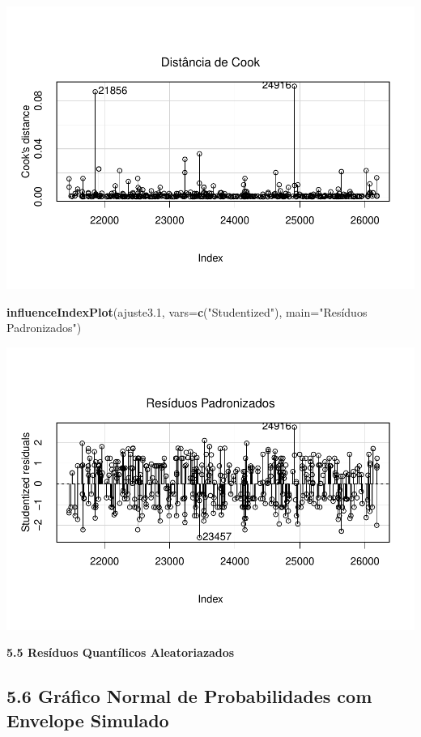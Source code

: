 \documentclass[]{article}
\newenvironment{Shaded}{\begin{snugshade}}{\end{snugshade}}
\newcommand{\KeywordTok}[1]{\textcolor[rgb]{0.13,0.29,0.53}{\textbf{{#1}}}}
\newcommand{\DataTypeTok}[1]{\textcolor[rgb]{0.13,0.29,0.53}{{#1}}}
\newcommand{\FloatTok}[1]{\textcolor[rgb]{0.00,0.00,0.81}{{#1}}}
\newcommand{\StringTok}[1]{\textcolor[rgb]{0.31,0.60,0.02}{{#1}}}
\newcommand{\NormalTok}[1]{{#1}}
\begin{document}
\includegraphics{Dados_Binários1_files/figure-latex/unnamed-chunk-17-1.pdf}

\begin{Shaded}
\begin{Highlighting}[]
\KeywordTok{influenceIndexPlot}\NormalTok{(ajuste3}\FloatTok{.1}\NormalTok{, }\DataTypeTok{vars=}\KeywordTok{c}\NormalTok{(}\StringTok{"Studentized"}\NormalTok{), }\DataTypeTok{main=}\StringTok{"Resíduos Padronizados"}\NormalTok{)}
\end{Highlighting}
\end{Shaded}

\includegraphics{Dados_Binários1_files/figure-latex/unnamed-chunk-18-1.pdf}

\textbf{5.5 Resíduos Quantílicos Aleatoriazados}

\subsection{\texorpdfstring{\textbf{5.6 Gráfico Normal de Probabilidades
com Envelope
Simulado}}{5.6 Gráfico Normal de Probabilidades com Envelope Simulado}}\label{grafico-normal-de-probabilidades-com-envelope-simulado}
\end{document}
